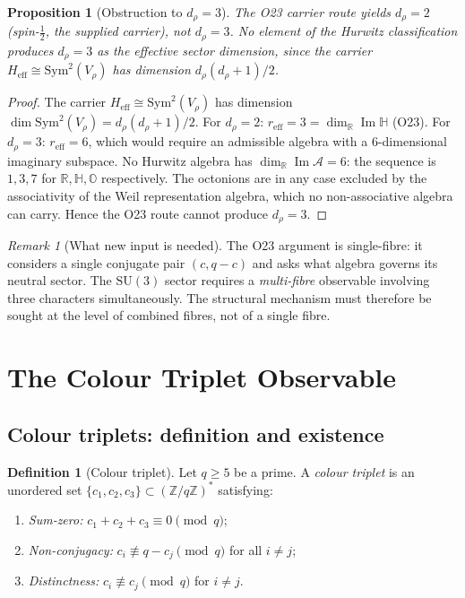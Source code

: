 \documentclass[11pt,a4paper]{article}
\newtheorem{proposition}[theorem]{Proposition}
\theoremstyle{definition}
\newtheorem{definition}[theorem]{Definition}
\theoremstyle{remark}
\newtheorem{remark}[theorem]{Remark}
\newcommand{\SU}{\mathrm{SU}}
\newcommand{\Sym}{\mathrm{Sym}}
\newcommand{\Vr}{V_{\rho}}
\newcommand{\dr}{d_{\rho}}
\newcommand{\Z}{\mathbb{Z}}
\newcommand{\R}{\mathbb{R}}
\newcommand{\HH}{\mathbb{H}}
\begin{document}
    \begin{proposition}[Obstruction to $d_\rho = 3$]
      \label{prop:obstruction}
      The O23 carrier route yields $\dr = 2$ (spin-$\tfrac{1}{2}$, the supplied carrier), not $\dr = 3$.
      No element of the Hurwitz classification produces $\dr = 3$ as the effective sector dimension,
      since the carrier $H_{\mathrm{eff}} \cong \Sym^2(\Vr)$ has dimension $\dr(\dr+1)/2$.
    \end{proposition}

    \begin{proof}
      The carrier $H_{\mathrm{eff}} \cong \Sym^2(\Vr)$ has dimension $\dim \Sym^2(\Vr) = \dr(\dr+1)/2$.
      For $\dr = 2$: $r_{\mathrm{eff}} = 3 = \dim_\R \operatorname{Im}\HH$ (O23).
      For $\dr = 3$: $r_{\mathrm{eff}} = 6$, which would require an admissible algebra with a
      6-dimensional imaginary subspace.
      No Hurwitz algebra has $\dim_\R \operatorname{Im}\mathcal{A} = 6$: the sequence is
      $1, 3, 7$ for $\R, \HH, \mathbb{O}$ respectively.
      The octonions are in any case excluded by the associativity of the Weil representation
      algebra, which no non-associative algebra can carry.
      Hence the O23 route cannot produce $\dr = 3$.
    \end{proof}

    \begin{remark}[What new input is needed]
      \label{rmk:new-input}
      The O23 argument is single-fibre: it considers a single conjugate pair $(c, q-c)$ and asks
      what algebra governs its neutral sector.
      The $\SU(3)$ sector requires a \emph{multi-fibre} observable involving three characters
      simultaneously.
      The structural mechanism must therefore be sought at the level of combined fibres, not of a
      single fibre.
    \end{remark}

  \section{The Colour Triplet Observable}
    \label{sec:triplet}

    \subsection{Colour triplets: definition and existence}
      \label{ssec:triplet-def}

      \begin{definition}[Colour triplet]
        \label{def:color-triplet}
        Let $q \geq 5$ be a prime.
        A \emph{colour triplet} is an unordered set $\{c_1, c_2, c_3\} \subset (\Z/q\Z)^*$ satisfying:
        \begin{enumerate}[label=(\roman*)]
\item \emph{Sum-zero:} $c_1 + c_2 + c_3 \equiv 0 \pmod{q}$;
\item \emph{Non-conjugacy:} $c_i \not\equiv q - c_j \pmod{q}$ for all $i \neq j$;
\item \emph{Distinctness:} $c_i \not\equiv c_j \pmod{q}$ for $i \neq j$.
        \end{enumerate}
      \end{definition}
\end{document}
